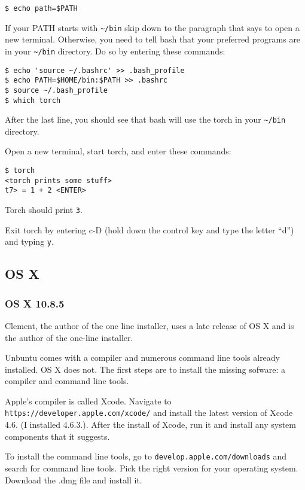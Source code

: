 \documentclass{article}
\let\code\texttt %
\begin{document}
\begin{verbatim}
$ echo path=$PATH
\end{verbatim}

If your PATH starts with \code{\textasciitilde/bin} skip down to the
paragraph that says to open a new terminal. Otherwise, you need to 
tell bash that your preferred programs are in your
\code{\textasciitilde/bin} directory. Do so by entering these commands:

\begin{verbatim}
$ echo 'source ~/.bashrc' >> .bash_profile
$ echo PATH=$HOME/bin:$PATH >> .bashrc
$ source ~/.bash_profile
$ which torch
\end{verbatim}

After the last line, you should see that bash will use the torch in your
\code{\textasciitilde/bin} directory.

Open a new terminal, start torch, and enter these commands:

\begin{verbatim}
$ torch
<torch prints some stuff>
t7> = 1 + 2 <ENTER>
\end{verbatim}

Torch should print \code{3}.

Exit torch by entering c-D (hold down the control key and type the
letter ``d'') and typing \code{y}.

\subsection{OS X}

\subsubsection{OS X 10.8.5}

Clement, the author of the one line installer,  uses a late release of OS X and is the author of the one-line
installer. 

Unbuntu comes with a compiler and numerous command line tools already
installed. OS X does not. The first steps are to install the missing
sofware: a compiler and command line tools.   

Apple's compiler is called Xcode. Navigate to
\code{https://developer.apple.com/xcode/} and install  the latest
version of Xcode 4.6. (I installed 4.6.3.). After the install of Xcode,
run it and install any system components that it suggests.

To install the command line tools, go to
\code{develop.apple.com/downloads} and search for command line tools.
Pick the right version for your operating system. Download the .dmg file
and install it.
\end{document}

